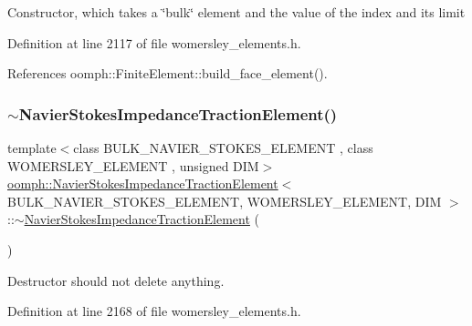 Constructor, which takes a \char`\"{}bulk\char`\"{} element and the value of the index and its limit 

Definition at line 2117 of file womersley\+\_\+elements.\+h.



References oomph\+::\+Finite\+Element\+::build\+\_\+face\+\_\+element().

\mbox{\label{classoomph_1_1NavierStokesImpedanceTractionElement_a19a1379dee4fab03c2f8574665bc4184}} 
\subsubsection{\texorpdfstring{$\sim$\+Navier\+Stokes\+Impedance\+Traction\+Element()}{~NavierStokesImpedanceTractionElement()}}
{\footnotesize\ttfamily template$<$class B\+U\+L\+K\+\_\+\+N\+A\+V\+I\+E\+R\+\_\+\+S\+T\+O\+K\+E\+S\+\_\+\+E\+L\+E\+M\+E\+NT , class W\+O\+M\+E\+R\+S\+L\+E\+Y\+\_\+\+E\+L\+E\+M\+E\+NT , unsigned D\+IM$>$ \\
\hyperlink{classoomph_1_1NavierStokesImpedanceTractionElement}{oomph\+::\+Navier\+Stokes\+Impedance\+Traction\+Element}$<$ B\+U\+L\+K\+\_\+\+N\+A\+V\+I\+E\+R\+\_\+\+S\+T\+O\+K\+E\+S\+\_\+\+E\+L\+E\+M\+E\+NT, W\+O\+M\+E\+R\+S\+L\+E\+Y\+\_\+\+E\+L\+E\+M\+E\+NT, D\+IM $>$\+::$\sim$\hyperlink{classoomph_1_1NavierStokesImpedanceTractionElement}{Navier\+Stokes\+Impedance\+Traction\+Element} (\begin{DoxyParamCaption}{ }\end{DoxyParamCaption})\hspace{0.3cm}{\ttfamily [inline]}}



Destructor should not delete anything. 



Definition at line 2168 of file womersley\+\_\+elements.\+h.



